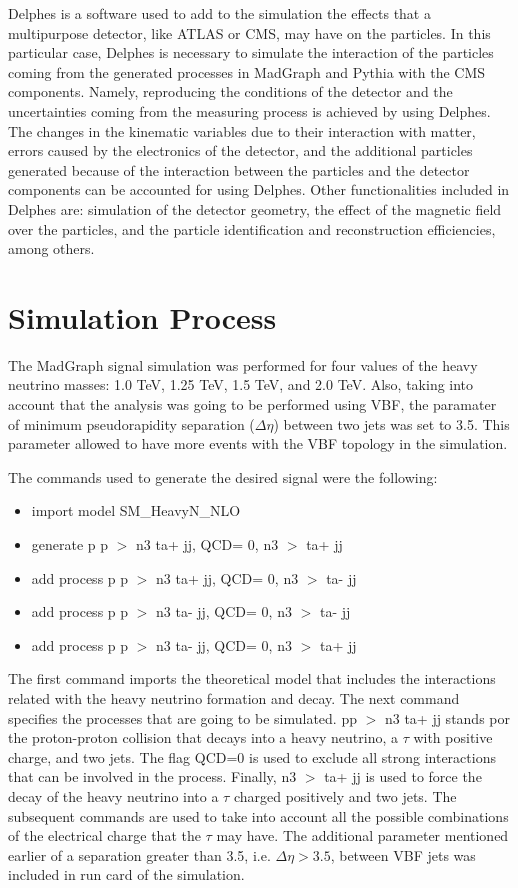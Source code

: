 Delphes is a software used to add to the simulation the effects that a multipurpose detector, like ATLAS or CMS, may have on the particles. In this particular case, Delphes is necessary to simulate the interaction of the particles coming from the generated processes in MadGraph and Pythia with the CMS components. Namely, reproducing the conditions of the detector and the uncertainties coming from the measuring process is achieved by using Delphes. The changes in the kinematic variables due to their interaction with matter, errors caused by the electronics of the detector, and the additional particles generated because of the interaction between the particles and the detector components can be accounted for using Delphes. Other functionalities included in Delphes are: simulation of the detector geometry, the effect of the magnetic field over the particles, and the particle identification and reconstruction efficiencies, among others.


\section{Simulation Process}

The MadGraph signal simulation was performed for four values of the heavy neutrino masses: 1.0 TeV, 1.25 TeV, 1.5 TeV, and 2.0 TeV. Also, taking into account that the analysis was going to be performed using VBF, the paramater of minimum pseudorapidity separation ($\Delta \eta$) between two jets was set to 3.5. This parameter allowed to have more events with the VBF topology in the simulation.

The commands used to generate the desired signal were the following:

\begin{itemize}
\item import model SM\_HeavyN\_NLO
\item generate p p $>$ n3 ta+ jj, QCD= 0, n3 $>$ ta+ jj
\item add process p p $>$ n3 ta+ jj, QCD= 0, n3 $>$ ta- jj
\item add process p p $>$ n3 ta- jj, QCD= 0, n3 $>$ ta- jj
\item add process p p $>$ n3 ta- jj, QCD= 0, n3 $>$ ta+ jj

\end{itemize}

The first command imports the theoretical model that includes the interactions related with the heavy neutrino formation and decay. The next command specifies the processes that are going to be simulated. pp $>$ n3 ta+ jj stands por the proton-proton collision that decays into a heavy neutrino, a $\tau$ with positive charge, and two jets. The flag QCD=0 is used to exclude all strong interactions that can be involved in the process. Finally, n3 $>$ ta+ jj is used to force the decay of the heavy neutrino into a $\tau$ charged positively and two jets. The subsequent commands are used to take into account all the possible combinations of the electrical charge that the $\tau$ may have. The additional parameter mentioned earlier of a separation greater than 3.5, i.e. $\Delta \eta > 3.5$, between VBF jets was included in run card of the simulation.

